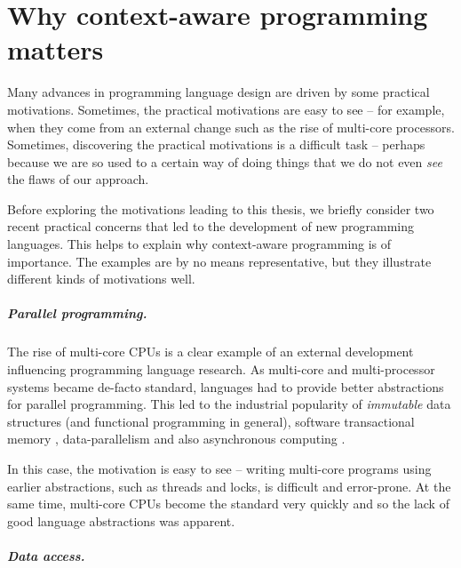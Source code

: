 
\chapter{Why context-aware programming matters} 
\label{ch:intro} 

Many advances in programming language design are driven by some practical motivations. Sometimes, 
the practical motivations are easy to see -- for example, when they come from an external change 
such as the rise of multi-core processors. Sometimes, discovering the practical motivations is a 
difficult task -- perhaps because we are so used to a certain way of doing things that we do not 
even \emph{see} the flaws of our approach. 

Before exploring the motivations leading to this thesis, we briefly consider two recent practical 
concerns that led to the development of new programming languages. This helps to explain why 
context-aware programming is of importance. The examples are by no means representative, but they 
illustrate different kinds of motivations well.

\paragraph{Parallel programming.} 

The rise of multi-core CPUs is a clear example of an external development influencing
programming language research. As multi-core and multi-processor systems became de-facto standard, 
languages had to provide better abstractions for parallel programming. This led to the industrial 
popularity of \emph{immutable} data structures (and functional programming in general), software 
transactional memory \cite{app-haskell-stm}, data-parallelism and also asynchronous 
computing \cite{app-fsharp-async}. 

In this case, the motivation is easy to see -- writing multi-core programs using earlier 
abstractions, such as threads and locks, is difficult and error-prone. At the same time, 
multi-core CPUs become the standard very quickly and so the lack of good language abstractions
was apparent.

\paragraph{Data access.}

